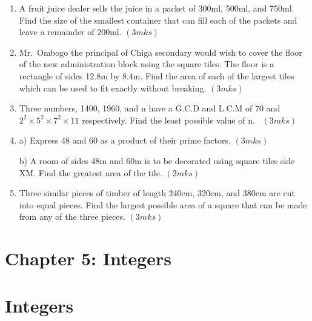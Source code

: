 \documentclass[
  a4paperpaper,
]{scrbook}
\begin{document}
\begin{tcolorbox}
\begin{enumerate}
\item
  A fruit juice dealer sells the juice in a packet of 300ml, 500ml, and
  750ml. Find the size of the smallest container that can fill each of
  the packets and leave a remainder of 200ml.\hspace{0.6cm} \((3mks)\)
\item
  Mr.~Ombogo the principal of Chiga secondary would wish to cover the
  floor of the new administration block using the square tiles. The
  floor is a rectangle of sides 12.8m by 8.4m. Find the area of each of
  the largest tiles which can be used to fit exactly without breaking.
  \hspace{14.2cm} \((3mks)\)
\item
  Three numbers, 1400, 1960, and n have a G.C.D and L.C.M of 70 and
  \(2^2\times 5^2\times 7^2 \times 11\) respectively. Find the least
  possible value of n.~\hspace{8.8cm} \((3mks)\)
\item
  a) Express 48 and 60 as a product of their prime factors.
  \hspace{11cm} \((3mks)\)

  b) A room of sides 48m and 60m is to be decorated using square tiles
  side XM. Find the greatest area of the tile. \hspace{9.2cm} \((2mks)\)
\item
  Three similar pieces of timber of length 240cm, 320cm, and 380cm are
  cut into equal pieces. Find the largest possible area of a square that
  can be made from any of the three pieces. \hspace{14.2cm} \((3mks)\)
\end{enumerate}

\end{tcolorbox}


\chapter{Chapter 5: Integers}\label{chapter-5-integers}


\chapter*{Integers}\label{integers}

\end{document}

